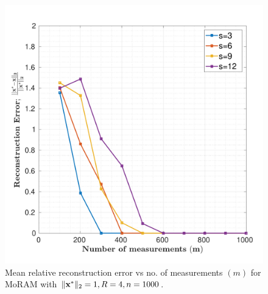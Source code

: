 \begin{figure}[h]
	\begin{center}
		\includegraphics[width=0.9\linewidth]{./fig/rconst_rcm_amp_1_r_4_s_3_12_m_100_1000_justice-pursuit.pdf}
	\end{center}
	\caption{{Mean relative reconstruction error vs no. of measurements $(m)$ for MoRAM with $\|\mathbf{x^*}\|_2=1,R=4,n=1000$.}}
	\label{fig:plot-r-4}
\end{figure}

